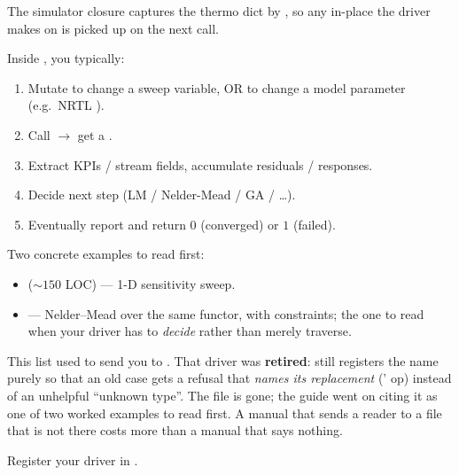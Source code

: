 \documentclass[11pt,a4paper]{article}
\begin{document}
The simulator closure captures the thermo dict by ,
so any in-place  the driver makes on
 is picked up on the next  call.

Inside , you typically:

\begin{enumerate}[leftmargin=*,nosep]
  \item Mutate  to change a
        sweep variable, OR  to
        change a model parameter (e.g.\ NRTL ).
  \item Call  $\to$ get a
        .
  \item Extract KPIs / stream fields, accumulate residuals / responses.
  \item Decide next step (LM / Nelder-Mead / GA / \dots).
  \item Eventually report and return $0$ (converged) or $1$ (failed).
\end{enumerate}

Two concrete examples to read first:
\begin{itemize}[leftmargin=*,nosep]
  \item {} ($\sim 150$ LOC)
        --- 1-D sensitivity sweep.
  \item {}
        --- Nelder--Mead over the same functor, with 
        constraints; the one to read when your driver has to \emph{decide}
        rather than merely traverse.
\end{itemize}

\begin{pitfall}
This list used to send you to .
That driver was \textbf{retired}:  still
registers the name  purely so that an old case gets a
refusal that \emph{names its replacement} ('
 op) instead of an unhelpful ``unknown type''.  The file
is gone; the guide went on citing it as one of two worked examples to read
first.  A manual that sends a reader to a file that is not there costs more
than a manual that says nothing.
\end{pitfall}

Register your driver in .
\end{document}
